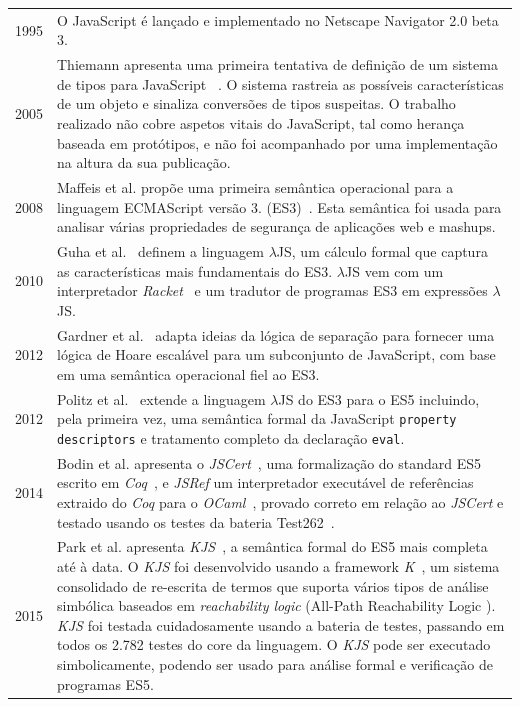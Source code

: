 \documentclass[runningheads]{llncs}
\begin{document}
\begin{table}[h!]
\vspace{-2em}
\renewcommand{\arraystretch}{1.8}

\begin{tabular}{@{\,}r <{\hskip 2pt} !{\makebox[0pt]{\textbullet}\hskip-0.5pt\vrule width 1pt\hspace{\labelsep}} >{\raggedright\arraybackslash}p{316pt}}
  1995 & O JavaScript é lançado e implementado no Netscape Navigator 2.0 beta 3.\\
  2005 & Thiemann apresenta uma primeira tentativa de definição de um sistema de tipos para JavaScript ~\cite{Thiemann-2005}. O sistema rastreia as possíveis características de um objeto e sinaliza conversões de tipos suspeitas. O trabalho realizado não cobre aspetos vitais do JavaScript, tal como herança baseada em protótipos, e não foi acompanhado por uma implementação na altura da sua publicação.\\
  2008 & Maffeis et al. propõe uma primeira semântica operacional para a linguagem ECMAScript versão 3. (ES3)~\cite{operational_semantics_javascript-2008}. Esta semântica foi usada para analisar várias propriedades de segurança de aplicações web e mashups.\\
  2010 & Guha et al.~\cite{essence_javascript-2010} definem a linguagem $\lambda$JS, um cálculo formal que  captura as características mais fundamentais do ES3. $\lambda$JS vem com um interpretador \emph{Racket}~\cite{Racket} e um tradutor de programas ES3 em expressões $\lambda$JS.\\
  2012 & Gardner et al.~\cite{Gardner-2012} adapta ideias da lógica de separação para fornecer uma lógica de Hoare escalável para um subconjunto de JavaScript, com base em uma semântica operacional fiel ao ES3.\\
  2012 & Politz et al.~\cite{Politz-2012} extende a linguagem $\lambda$JS do ES3 para o ES5 incluindo, pela primeira vez, uma semântica formal da JavaScript \texttt{property descriptors} e tratamento completo da declaração \texttt{eval}.\\
  2014 & Bodin et al. apresenta o \emph{JSCert}~\cite{JSCert-2014}, uma formalização do standard ES5 escrito em \emph{Coq}~\cite{Coq}, e \emph{JSRef} um interpretador executável de referências extraido do \emph{Coq} para o \emph{OCaml}~\cite{OCaml}, provado correto em relação ao \emph{JSCert} e testado usando os testes da bateria Test262~\cite{Test262}.\\
  2015 & Park et al. apresenta \emph{KJS}~\cite{KJS-2015}, a semântica formal do ES5 mais completa até à data. O \emph{KJS} foi desenvolvido usando a framework \emph{K}~\cite{Kframework}, um sistema consolidado de re-escrita de termos que suporta vários tipos de análise simbólica baseados em \emph{reachability logic} (All-Path Reachability Logic \cite{All-Path_Reachability_Logic}). \emph{KJS} foi testada cuidadosamente usando a bateria de testes, passando em todos os 2.782 testes do core da linguagem. O \emph{KJS} pode ser executado simbolicamente, podendo ser usado para análise formal e verificação de programas ES5.\\

\end{tabular}
\end{table}
\end{document}
